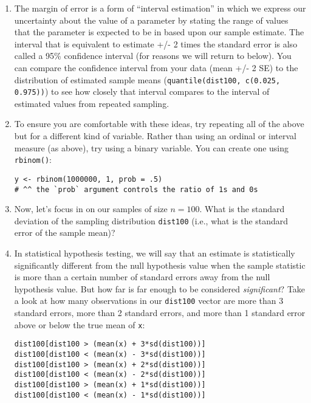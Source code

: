 \documentclass[a4paper,12pt]{article}
\begin{document}
\begin{enumerate}
\item The margin of error is a form of ``interval estimation'' in which we express our uncertainty about the value of a parameter by stating the range of values that the parameter is expected to be in based upon our sample estimate. The interval that is equivalent to estimate +/- 2 times the standard error is also called a 95\% confidence interval (for reasons we will return to below). You can compare the confidence interval from your data (mean +/- 2 SE) to the distribution of estimated sample means (\texttt{quantile(dist100, c(0.025, 0.975))}) to see how closely that interval compares to the interval of estimated values from repeated sampling.

\item To ensure you are comfortable with these ideas, try repeating all of the above but for a different kind of variable. Rather than using an ordinal or interval measure (as above), try using a binary variable. You can create one using \texttt{rbinom()}:

\begin{verbatim}
y <- rbinom(1000000, 1, prob = .5) 
# ^^ the `prob` argument controls the ratio of 1s and 0s
\end{verbatim}

\item Now, let's focus in on our samples of size $n=100$. What is the standard deviation of the sampling distribution \texttt{dist100} (i.e., what is the standard error of the sample mean)?

\item In statistical hypothesis testing, we will say that an estimate is statistically significantly different from the null hypothesis value when the sample statistic is more than a certain number of standard errors away from the null hypothesis value. But how far is far enough to be considered \textit{significant}? Take a look at how many observations in our \texttt{dist100} vector are more than 3 standard errors, more than 2 standard errors, and more than 1 standard error above or below the true mean of \texttt{x}:

\begin{verbatim}
dist100[dist100 > (mean(x) + 3*sd(dist100))]
dist100[dist100 < (mean(x) - 3*sd(dist100))]
dist100[dist100 > (mean(x) + 2*sd(dist100))]
dist100[dist100 < (mean(x) - 2*sd(dist100))]
dist100[dist100 > (mean(x) + 1*sd(dist100))]
dist100[dist100 < (mean(x) - 1*sd(dist100))]
\end{verbatim}


\end{enumerate}
\end{document}
